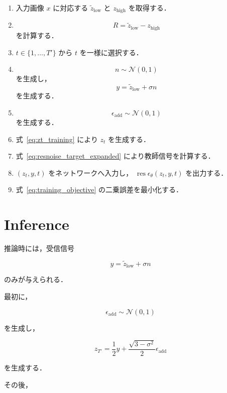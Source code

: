 \documentclass[a4paper,10pt,twocolumn]{ltjsarticle}
\begin{document}
\begin{enumerate}
  \item 入力画像 $x$ に対応する
  $\tilde z_{\mathrm{low}}$ と
  $z_{\mathrm{high}}$ を取得する．

  \item
  \[
  R
  =
  \tilde z_{\mathrm{low}}
  -
  z_{\mathrm{high}}
  \]
  を計算する．

  \item
  $t\in\{1,\ldots,T'\}$ から
  $t$ を一様に選択する．

  \item
  \[
  n\sim\mathcal{N}(0,1)
  \]
  を生成し，
  \[
  y
  =
  \tilde z_{\mathrm{low}}
  +
  \sigma n
  \]
  を生成する．

  \item
  \[
  \epsilon_{\mathrm{add}}
  \sim
  \mathcal{N}(0,1)
  \]
  を生成する．

  \item 式~\eqref{eq:zt_training} により
  $z_t$ を生成する．

  \item 式~\eqref{eq:resnoise_target_expanded}
  により教師信号を計算する．

  \item
  $(z_t,y,t)$ をネットワークへ入力し，
  $\operatorname{res}\epsilon_{\theta}(z_t,y,t)$
  を出力する．

  \item 式~\eqref{eq:training_objective}
  の二乗誤差を最小化する．
\end{enumerate}


\section{Inference}

推論時には，受信信号

\[
y
=
\tilde z_{\mathrm{low}}
+
\sigma n
\]

のみが与えられる．

最初に，

\[
\epsilon_{\mathrm{add}}
\sim
\mathcal{N}(0,1)
\]

を生成し，

\begin{equation}
z_{T'}
=
\frac{1}{2}y
+
\frac{\sqrt{3-\sigma^2}}{2}
\epsilon_{\mathrm{add}}
\label{eq:inference_initial}
\end{equation}

を生成する．

その後，
\end{document}

